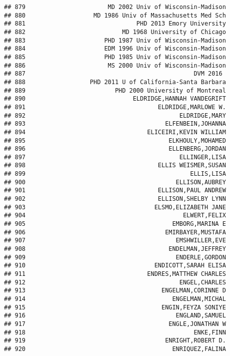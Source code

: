 \documentclass[
]{article}
\begin{document}
\begin{verbatim}
## 879                       MD 2002 Univ of Wisconsin-Madison
## 880                   MD 1986 Univ of Massachusetts Med Sch
## 881                               PHD 2013 Emory University
## 882                           MD 1968 University of Chicago
## 883                      PHD 1987 Univ of Wisconsin-Madison
## 884                      EDM 1996 Univ of Wisconsin-Madison
## 885                      PHD 1985 Univ of Wisconsin-Madison
## 886                       MS 2000 Univ of Wisconsin-Madison
## 887                                               DVM 2016 
## 888                  PHD 2011 U of California-Santa Barbara
## 889                         PHD 2000 University of Montreal
## 890                              ELDRIDGE,HANNAH VANDEGRIFT
## 891                                     ELDRIDGE,MARLOWE W.
## 892                                           ELDRIDGE,MARY
## 893                                       ELFENBEIN,JOHANNA
## 894                                  ELICEIRI,KEVIN WILLIAM
## 895                                        ELKHOULY,MOHAMED
## 896                                        ELLENBERG,JORDAN
## 897                                           ELLINGER,LISA
## 898                                     ELLIS WEISMER,SUSAN
## 899                                              ELLIS,LISA
## 900                                          ELLISON,AUBREY
## 901                                     ELLISON,PAUL ANDREW
## 902                                     ELLISON,SHELBY LYNN
## 903                                    ELSMO,ELIZABETH JANE
## 904                                            ELWERT,FELIX
## 905                                         EMBORG,MARINA E
## 906                                       EMIRBAYER,MUSTAFA
## 907                                          EMSHWILLER,EVE
## 908                                        ENDELMAN,JEFFREY
## 909                                          ENDERLE,GORDON
## 910                                    ENDICOTT,SARAH ELISA
## 911                                  ENDRES,MATTHEW CHARLES
## 912                                           ENGEL,CHARLES
## 913                                      ENGELMAN,CORINNE D
## 914                                         ENGELMAN,MICHAL
## 915                                      ENGIN,FEYZA SONIYE
## 916                                          ENGLAND,SAMUEL
## 917                                        ENGLE,JONATHAN W
## 918                                               ENKE,FINN
## 919                                       ENRIGHT,ROBERT D.
## 920                                         ENRIQUEZ,FALINA

\end{verbatim}
\end{document}
